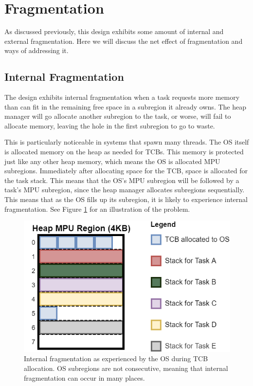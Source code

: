 \section{Fragmentation}

As discussed previously, this design exhibits some amount of internal and external fragmentation.
Here we will discuss the net effect of fragmentation and ways of addressing it.

\subsection{Internal Fragmentation}

The design exhibits internal fragmentation when a task requests more memory than can fit in the remaining free space in a subregion it already owns. The heap manager will go allocate another subregion to the task, or worse, will fail to allocate memory, leaving the hole in the first subregion to go to waste.

This is particularly noticeable in systems that spawn many threads. The OS itself is allocated memory on the heap as needed for TCBs. This memory is protected just like any other heap memory, which means the OS is allocated MPU subregions. Immediately after allocating space for the TCB, space is allocated for the task stack. This means that the OS's MPU subregion will be followed by a task's MPU subregion, since the heap manager allocates subregions sequentially. This means that as the OS fills up its subregion, it is likely to experience internal fragmentation. See Figure \ref{fig:internal_frag} for an illustration of the problem.

\begin{figure}[hbtp]
	\centering
	\includegraphics[width=0.7\linewidth]{figs/OS_int_frag.png}
	\caption{Internal fragmentation as experienced by the OS during TCB allocation. OS subregions are not consecutive, meaning that internal fragmentation can occur in many places.}
	\label{fig:internal_frag}
\end{figure}

